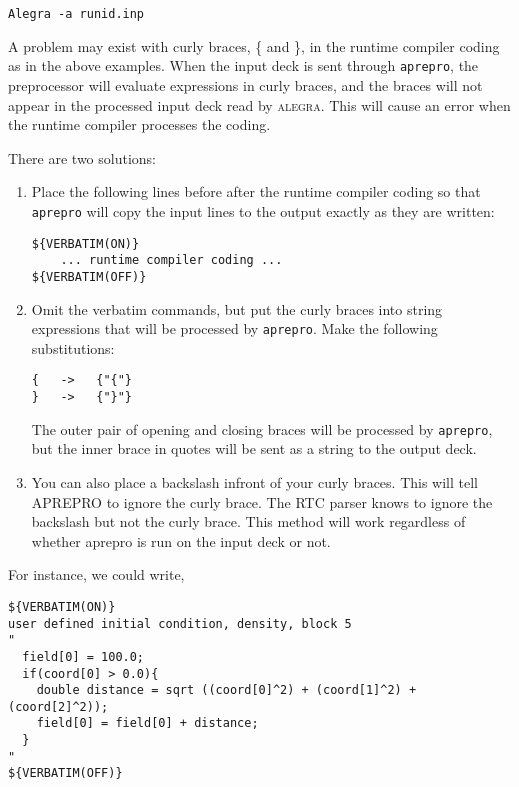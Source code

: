 \noindent
\texttt{Alegra -a runid.inp}

A problem may exist with curly braces, \{ and \}, in the runtime compiler coding
as in the above examples.  When the input deck is sent through \texttt{aprepro},
the preprocessor will evaluate expressions in curly braces, and the braces
will not appear in the processed input deck read by \textsc{alegra}.
This will cause an error when the runtime compiler processes the coding.

\noindent
There are two solutions:
\begin{enumerate}

\item Place the following lines before after the runtime compiler coding
      so that \texttt{aprepro} will copy the input lines to the output
      exactly as they are written:

{\ttfamily \begin{verbatim}
${VERBATIM(ON)}
    ... runtime compiler coding ...
${VERBATIM(OFF)}
\end{verbatim}
}

\item Omit the verbatim commands, but put the curly braces into string expressions
      that will be processed by \texttt{aprepro}.  Make the following substitutions:

{\ttfamily \begin{verbatim}
{   ->   {"{"}
}   ->   {"}"}
\end{verbatim}
}

The outer pair of opening and closing braces will be processed by \texttt{aprepro},
but the inner brace in quotes will be sent as a string to the output deck.

\item You can also place a backslash infront of your curly braces. This will
      tell APREPRO to ignore the curly brace. The RTC parser knows to ignore
      the backslash but not the curly brace. This method will work regardless
      of whether aprepro is run on the input deck or not.

\end{enumerate}

\noindent
For instance, we could write,
%
{\ttfamily \begin{verbatim}
${VERBATIM(ON)}
user defined initial condition, density, block 5
"
  field[0] = 100.0;
  if(coord[0] > 0.0){
    double distance = sqrt ((coord[0]^2) + (coord[1]^2) + (coord[2]^2));
    field[0] = field[0] + distance;
  }
"
${VERBATIM(OFF)}
\end{verbatim}
}

